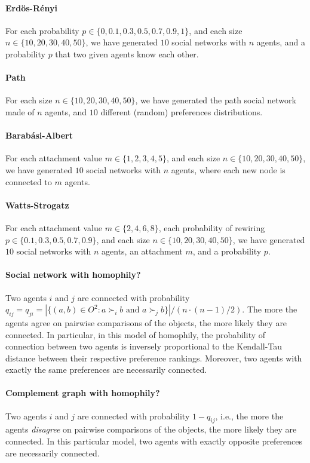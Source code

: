 \documentclass{article}
\begin{document}
\paragraph{Erd\"os-R\'enyi} For each probability $p \in \{0, 0.1, 0.3, 0.5, 0.7, 0.9, 1\}$, and each size $n \in \{10,20,30,40,50\}$, we have generated $10$ social networks with $n$ agents, and a probability $p$ that two given agents know each other.

\paragraph{Path} For each size $n \in \{10,20,30,40,50\}$, we have generated the path social network made of $n$ agents, and $10$ different (random) preferences distributions.

\paragraph{Barab\'asi-Albert} For each attachment value $m \in \{1,2,3,4,5\}$, and each size $n \in \{10,20,30,40,50\}$, we have generated $10$ social networks with $n$ agents, where each new node is connected to $m$ agents.

\paragraph{Watts-Strogatz} For each attachment value $m \in \{2,4,6,8\}$, each probability of rewiring $p \in \{0.1, 0.3, 0.5, 0.7, 0.9\}$, and each size $n \in \{10,20,30,40,50\}$, we have generated $10$ social networks with $n$ agents, an attachment $m$, and a probability $p$.

\paragraph{Social network with homophily?} Two agents $i$ and $j$ are connected with probability $q_{ij}=q_{ji}=|\{(a,b)\in O^2:a\succ_i b\text{ and }a\succ_j b\}|/(n\cdot (n-1)/2)$.
The more the agents agree on pairwise comparisons of the objects, the more likely they are connected. 
In particular, in this model of homophily, the probability of connection between two agents is inversely proportional to the Kendall-Tau distance between their respective preference rankings. 
Moreover, two agents with exactly the same preferences are necessarily connected.

\paragraph{Complement graph with homophily?} Two agents $i$ and $j$ are connected with probability $1-q_{ij}$, i.e., the more the agents \emph{disagree} on pairwise comparisons of the objects, the more likely they are connected. 
In this particular model, two agents with exactly opposite preferences are necessarily connected. 
\end{document}
